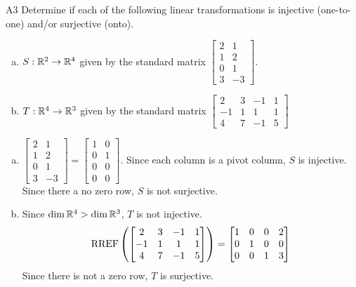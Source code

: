\documentclass{sbgLAsemi}
\begin{document}
\begin{problem}{A3}
Determine if each of the following linear transformations is injective (one-to-one) and/or surjective (onto).
\begin{enumerate}[(a)]
\item $S: \mathbb{R}^2 \rightarrow \mathbb{R}^4$ given by the standard matrix $\begin{bmatrix} 2 & 1 \\ 1 & 2 \\ 0 & 1 \\ 3 & -3 \end{bmatrix}$.
\item $T: \mathbb{R}^4 \rightarrow \mathbb{R}^3$ given by the standard matrix $\begin{bmatrix} 2 & 3 & -1 & 1 \\ -1 & 1 & 1 & 1 \\ 4 & 7 & -1 & 5 \end{bmatrix}$
\end{enumerate}
\end{problem}
\begin{solution}
\begin{enumerate}[(a)]
\item $ \begin{bmatrix} 2 & 1 \\ 1 & 2 \\ 0 & 1 \\ 3 & -3 \end{bmatrix}=\begin{bmatrix}1 & 0 \\ 0 & 1 \\ 0 & 0 \\ 0 & 0  \end{bmatrix}$.  Since each column is a pivot column, $S$ is injective.  Since there a no zero row, $S$ is not surjective.
\item Since $\dim \mathbb{R}^4 > \dim \mathbb{R}^3$, $T$ is not injective.
$$\operatorname{RREF}\left(\begin{bmatrix} 2 & 3 & -1 & 1 \\ -1 & 1 & 1 & 1 \\ 4 & 7 & -1 & 5 \end{bmatrix}\right) = \begin{bmatrix} 1 & 0  & 0 & 2 \\ 0 & 1 & 0 & 0  \\ 0 & 0 & 1 & 3 \end{bmatrix}$$
Since there is not a zero row, $T$ is surjective.
\end{enumerate}
\end{solution}
\end{document}
